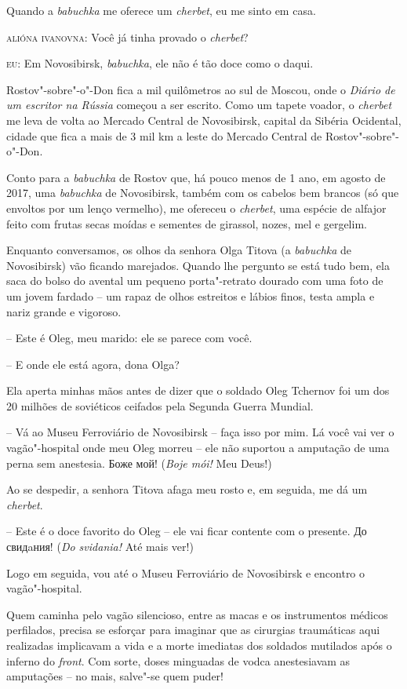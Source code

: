 Quando a \emph{babuchka} me oferece um \emph{cherbet}, eu me sinto em
casa.

\textsc{alióna ivanovna:} Você já tinha provado o \emph{cherbet}?

\textsc{eu:} Em Novosibirsk, \emph{babuchka}, ele não é tão doce como o
daqui.

Rostov"-sobre"-o"-Don fica a mil quilômetros ao sul de Moscou, onde o
\emph{Diário de um escritor na Rússia} começou a ser escrito. Como um
tapete voador, o \emph{cherbet} me leva de volta ao Mercado Central de
Novosibirsk, capital da Sibéria Ocidental, cidade que fica a mais de 3
mil km a leste do Mercado Central de Rostov"-sobre"-o"-Don.

Conto para a \emph{babuchka} de Rostov que, há pouco menos de 1 ano, em
agosto de 2017, uma \emph{babuchka} de Novosibirsk, também com os
cabelos bem brancos (só que envoltos por um lenço vermelho), me ofereceu
o \emph{cherbet}, uma espécie de alfajor feito com frutas secas moídas e
sementes de girassol, nozes, mel e gergelim.

Enquanto conversamos, os olhos da senhora Olga Titova (a \emph{babuchka}
de Novosibirsk) vão ficando marejados. Quando lhe pergunto se está tudo
bem, ela saca do bolso do avental um pequeno porta"-retrato dourado com
uma foto de um jovem fardado -- um rapaz de olhos estreitos e lábios
finos, testa ampla e nariz grande e vigoroso.

-- Este é Oleg, meu marido: ele se parece com você.

-- E onde ele está agora, dona Olga?

Ela aperta minhas mãos antes de dizer que o soldado Oleg Tchernov foi um
dos 20 milhões de soviéticos ceifados pela Segunda Guerra Mundial.

-- Vá ao Museu Ferroviário de Novosibirsk -- faça isso por mim. Lá você
vai ver o vagão"-hospital onde meu Oleg morreu -- ele não suportou a
amputação de uma perna sem anestesia. Боже мой! (\emph{Boje mói!} Meu
Deus!)

Ao se despedir, a senhora Titova afaga meu rosto e, em seguida, me dá um
\emph{cherbet}.

-- Este é o doce favorito do Oleg -- ele vai ficar contente com o
presente. До свидaния! (\emph{Do svidania!} Até mais ver!)

Logo em seguida, vou até o Museu Ferroviário de Novosibirsk e encontro o
vagão"-hospital.

Quem caminha pelo vagão silencioso, entre as macas e os instrumentos
médicos perfilados, precisa se esforçar para imaginar que as cirurgias
traumáticas aqui realizadas implicavam a vida e a morte imediatas dos
soldados mutilados após o inferno do \emph{front}. Com sorte, doses
minguadas de vodca anestesiavam as amputações -- no mais, salve"-se quem
puder!


